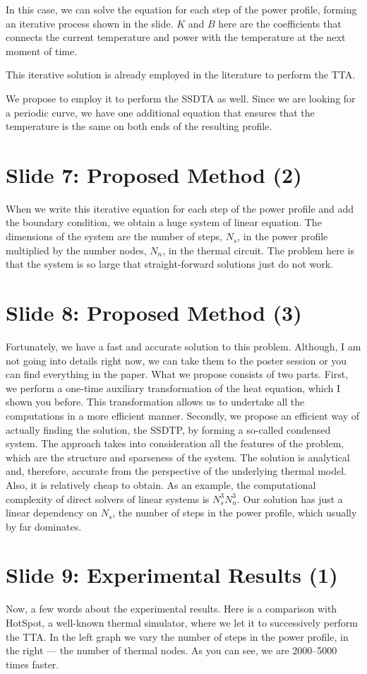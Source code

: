 \documentclass[11pt,a4paper]{article}
\begin{document}
In this case, we can solve the equation for each step of the power profile, forming an iterative process shown in the slide. $K$ and $B$ here are the coefficients that connects the current temperature and power with the temperature at the next moment of time.

This iterative solution is already employed in the literature to perform the TTA.

We propose to employ it to perform the SSDTA as well. Since we are looking for a periodic curve, we have one additional equation that ensures that the temperature is the same on both ends of the resulting profile.

\section{Slide 7: Proposed Method (2)}
When we write this iterative equation for each step of the power profile and add the boundary condition, we obtain a huge system of linear equation. The dimensions of the system are the number of steps, $N_s$, in the power profile multiplied by the number nodes, $N_n$, in the thermal circuit. The problem here is that the system is so large that straight-forward solutions just do not work.

\section{Slide 8: Proposed Method (3)}
Fortunately, we have a fast and accurate solution to this problem. Although, I am not going into details right now, we can take them to the poster session or you can find everything in the paper. What we propose consists of two parts. First, we perform a one-time auxiliary transformation of the heat equation, which I shown you before. This transformation allows us to undertake all the computations in a more efficient manner. Secondly, we propose an efficient way of actually finding the solution, the SSDTP, by forming a so-called condensed system. The approach takes into consideration all the features of the problem, which are the structure and sparseness of the system. The solution is analytical and, therefore, accurate from the perspective of the underlying thermal model. Also, it is relatively cheap to obtain. As an example, the computational complexity of direct solvers of linear systems is $N_s^3 N_n^3$. Our solution has just a linear dependency on $N_s$, the number of steps in the power profile, which usually by far dominates.

\section{Slide 9: Experimental Results (1)}
Now, a few words about the experimental results. Here is a comparison with HotSpot, a well-known thermal simulator, where we let it to successively perform the TTA. In the left graph we vary the number of steps in the power profile, in the right --- the number of thermal nodes. As you can see, we are 2000--5000 times faster.
\end{document}
